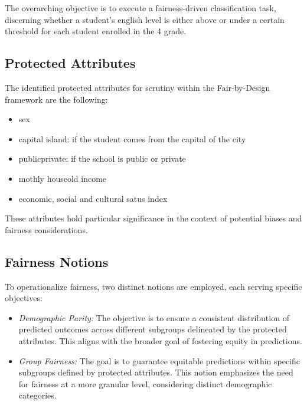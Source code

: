 The overarching objective is to execute a fairness-driven classification task, discerning whether a student's english level is either above or under a certain threshold for each student enrolled in the 4 grade.

\subsection{Protected Attributes}

The identified protected attributes for scrutiny within the Fair-by-Design framework are the following:

\begin{itemize}

    \item sex

    \item capital island: if the student comes from the capital of the city

    \item public\textunderscore private: if the school is public or private
    
    \item mothly houseold income

    \item economic, social and cultural satus index

\end{itemize}

These attributes hold particular significance in the context of potential biases and fairness considerations.

\subsection{Fairness Notions}

To operationalize fairness, two distinct notions are employed, each serving specific objectives:

\begin{itemize}
    \item \emph{Demographic Parity:} The objective is to ensure a consistent distribution of predicted outcomes across different subgroups delineated by the protected attributes. This aligns with the broader goal of fostering equity in predictions.

    \item \emph{Group Fairness:} The goal is to guarantee equitable predictions within specific subgroups defined by protected attributes. This notion emphasizes the need for fairness at a more granular level, considering distinct demographic categories.
\end{itemize}


